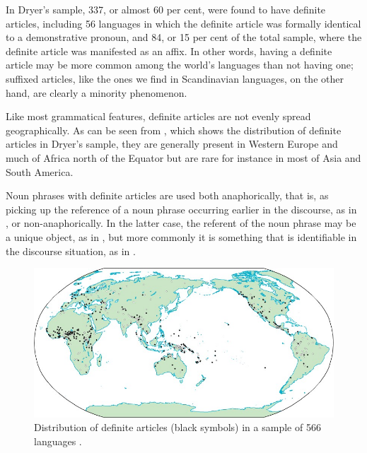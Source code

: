 In Dryer’s sample, 337, or almost 60 per cent, were found to have definite articles, including 56 languages in which the definite article was formally identical to a demonstrative pronoun, and 84, or 15 per cent of the total sample, where the definite article was manifested as an affix. In other words, having a definite article may be more common among the world’s languages than not having one; suffixed articles, like the ones we find in Scandinavian languages, on the other hand, are clearly a minority phenomenon. 

Like most grammatical features, definite articles are not evenly spread geographically. As can be seen from , which shows the distribution of definite articles in Dryer’s sample, they are generally present in Western Europe and much of Africa north of the Equator but are rare for instance in most of Asia and South America.

Noun phrases with definite articles are used both anaphorically, that is, as picking up the reference of a noun phrase occurring earlier in the discourse, as in , or non-anaphorically. In the latter case, the referent of the noun phrase may be a unique object, as in , but more commonly it is something that is identifiable in the discourse situation, as in .

\begin{figure}
\includegraphics[height=.35\textheight]{figures/10_DistributionDefArticles}
\caption{Distribution of definite articles (black symbols) in a sample of 566 languages \citep{Dryer2005}.}
\label{map:8}
\end{figure}
 
